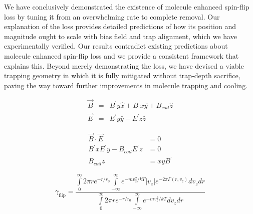 \documentclass[%
 reprint,
 amsmath,amssymb,
 aps,
prl,
]{revtex4-1}
\begin{document}
We have conclusively demonstrated the existence of molecule enhanced spin-flip loss by tuning it from an overwhelming rate to complete removal. Our explanation of the loss provides detailed predictions of how its position and magnitude ought to scale with bias field and trap alignment, which we have experimentally verified. Our results contradict existing predictions about molecule enhanced spin-flip loss and we provide a consistent framework that explains this. Beyond merely demonstrating the loss, we have devised a viable trapping geometry in which it is fully mitigated without trap-depth sacrifice, paving the way toward further improvements in molecule trapping and cooling.

\begin{eqnarray}
\vec{B} &=&  B^\prime y\hat{x}+ B^\prime x\hat{y} + B_{coil} \hat{z}\\
\vec{E} &=&  E^\prime y\hat{y}-  E^\prime z\hat{z}
\end{eqnarray}

\begin{eqnarray}
\vec{B}\cdot \vec{E} &= 0\\
B^\prime x E^\prime y - B_{coil}  E^\prime z &= 0\\
B_{coil}z &= xyB^\prime
\end{eqnarray}

\begin{equation}
\gamma_\text{flip}=\frac{\int\limits^\infty_0 2\pi r e^{-r/r_0} \int\limits^\infty_{-\infty} e^{-mv_z^2/kT} |v_z| e^{-2\pi\Gamma(r,v_z)}dv_zdr}{\int\limits^\infty_0 2\pi r e^{-r/r_0} \int\limits^\infty_{-\infty} e^{-mv_z^2/kT} dv_zdr}
\end{equation}

\nocite{*}

\end{document}
